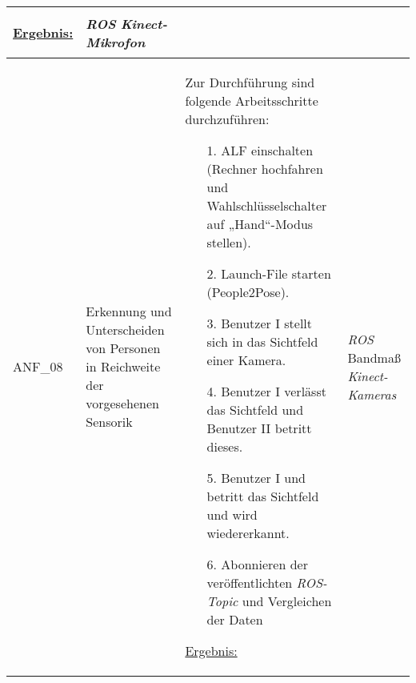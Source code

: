 \documentclass[12pt,a4paper,oneside,numbers=noenddot,captions=tableheading,toc=bibliography,openany,tikz,margin=5mm]{scrbook}
\begin{document}
\begin{longtable}{|p{}|p{}|p{7cm}|p{}|}
	\underline{Ergebnis:}\newline
	\newline
	
	\textbf{}	%
	& \textit{ROS}\newline
	\textit{Kinect-Mikrofon}\newline
	\\
	\hline
	
	ANF\_08 & Erkennung und Unterscheiden von Personen in Reichweite der vorgesehenen Sensorik & Zur Durchführung sind folgende Arbeitsschritte durchzuführen:
	\begin{itemize}
			
		\item[1.]	ALF einschalten (Rechner hochfahren und Wahlschlüsselschalter auf „Hand“-Modus stellen).
		\item[2.]	Launch-File starten (People2Pose).
		\item[3.]	Benutzer I stellt sich in das Sichtfeld einer Kamera.
		\item[4.]	Benutzer I verlässt das Sichtfeld und Benutzer II betritt dieses.
		\item[5.]	Benutzer I und betritt das Sichtfeld und wird wiedererkannt.
		\item[6.]	Abonnieren der veröffentlichten \textit{ROS-Topic} und Vergleichen der Daten

	\end{itemize}
	
	\underline{Ergebnis:}\newline
	\newline
	
	\textbf{}	%
	& \textit{ROS}\newline
	Bandmaß\newline
	\textit{Kinect-Kameras}
	\\
	\hline
	

\end{longtable}
\end{document}
